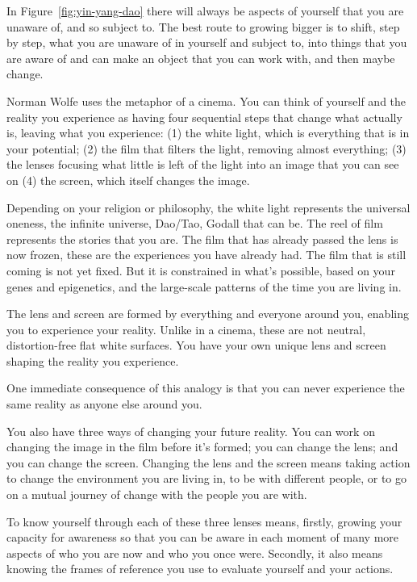 In Figure~\ref{fig:yin-yang-dao} there will always be aspects of yourself that you are unaware of, and so subject to. The best route to growing bigger is to shift, step by step, what you are unaware of in yourself and subject to, into things that you are aware of and can make an object that you can work with, and then maybe change. 


Norman Wolfe\cite{wolfe-tlo}  uses the metaphor  of a cinema. You can think of yourself and the reality you experience as having four sequential steps that change what actually is, leaving what you experience: (1) the white light, which is everything that is in your potential; (2) the film that filters the light, removing almost everything; (3) the lenses focusing what little is left of the light into an image that you can see on (4) the screen, which itself changes the image.


Depending on your religion or philosophy, the white light represents the universal oneness, the infinite universe, Dao/Tao,  God\textemdash all that can be. The reel of film represents the stories that you are. The film that has already passed the lens is now frozen, these are the experiences you have already had. The film that is still coming is not yet fixed. But it is constrained in what's possible, based on your genes and epigenetics, and the large-scale patterns of the time you are living in.


The lens  and screen are formed by everything and everyone around you, enabling you to experience your reality. Unlike in a cinema, these are not neutral, distortion-free flat white surfaces. You have your own unique lens and screen shaping the reality you experience.


One immediate consequence of this analogy is that you can never experience the same reality as anyone else around you. 


You also have three ways of changing your future reality. You can work on changing the image in the film before it's formed; you can change the lens; and you can change the screen. Changing the lens and the screen means taking action to change the environment you are living in, to be with different people, or to go on a mutual journey of change with the people you are with.


To know yourself through each of these three lenses means, firstly, growing your capacity for awareness so that you can be aware in each moment of many more aspects of who you are now and who you once were. Secondly, it also means knowing the frames of reference  you use to evaluate yourself and your actions.
